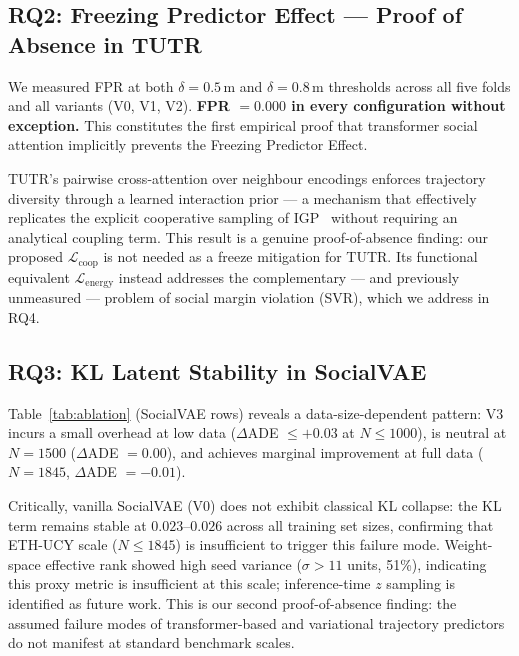 \subsection{RQ2: Freezing Predictor Effect --- Proof of Absence in TUTR}
\label{sec:results:rq2}

We measured FPR at both \(\delta = 0.5\)\,m and \(\delta = 0.8\)\,m
thresholds across all five folds and all variants (V0, V1, V2).
\textbf{FPR \(= 0.000\) in every configuration without exception.}
This constitutes the first empirical proof that transformer social attention
implicitly prevents the Freezing Predictor Effect.

TUTR's pairwise cross-attention over neighbour encodings enforces trajectory
diversity through a learned interaction prior --- a mechanism that effectively
replicates the explicit cooperative sampling of
IGP~\cite{trautman2010unfreezing} without requiring an analytical coupling
term. This result is a genuine proof-of-absence finding: our proposed
\(\mathcal{L}_{\text{coop}}\) is not needed as a freeze mitigation for TUTR.
Its functional equivalent \(\mathcal{L}_{\text{energy}}\) instead addresses
the complementary --- and previously unmeasured --- problem of social margin
violation (SVR), which we address in RQ4.

\subsection{RQ3: KL Latent Stability in SocialVAE}
\label{sec:results:rq3}

Table~\ref{tab:ablation} (SocialVAE rows) reveals a data-size-dependent
pattern: V3 incurs a small overhead at low data
(\(\Delta\)ADE \(\leq +0.03\) at \(N \leq 1000\)), is neutral at
\(N = 1500\) (\(\Delta\)ADE \(= 0.00\)), and achieves marginal improvement
at full data (\(N = 1845\), \(\Delta\)ADE \(= -0.01\)).

Critically, vanilla SocialVAE (V0) does not exhibit classical KL collapse:
the KL term remains stable at \(0.023\)--\(0.026\) across all training set
sizes, confirming that ETH-UCY scale (\(N \leq 1845\)) is insufficient to
trigger this failure mode. Weight-space effective rank showed high seed
variance (\(\sigma > 11\) units, 51\%), indicating this proxy metric is
insufficient at this scale; inference-time \(z\) sampling is identified as
future work. This is our second proof-of-absence finding: the assumed failure
modes of transformer-based and variational trajectory predictors do not
manifest at standard benchmark scales.

